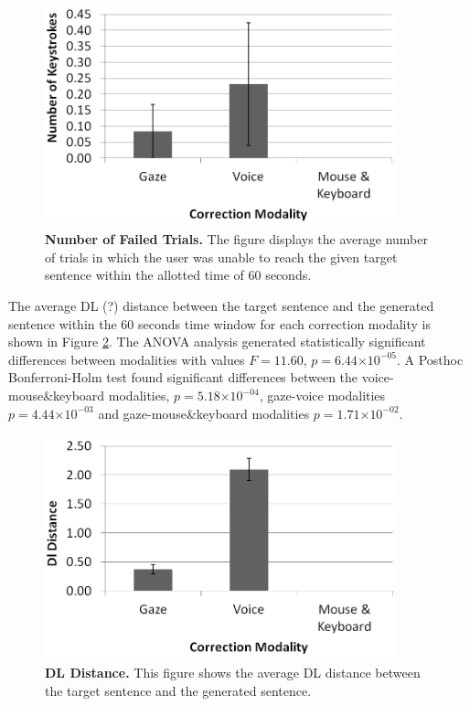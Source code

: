 \documentclass[]{article}
\providecommand{\e}[1]{\ensuremath{\times 10^{#1}}}
\begin{document}
\begin{figure}[ht]
\begin{center}
\vspace{-3mm}
\includegraphics[width=0.9\textwidth,height=65mm]{figures/fail.png}
\end{center}
\caption{\textbf{Number of Failed Trials.} The figure displays the average number of trials in which the user
was unable to reach the given target sentence within the allotted time of 60 seconds.}
\label{failFig}
\end{figure}

The average DL (?) distance between the target sentence and the generated sentence within the 60 seconds time window for
each correction modality is shown in Figure \ref{dldistance}. The ANOVA analysis generated statistically
significant differences between modalities with values $F=11.60$, $p=6.44\e{-05}$. A Posthoc Bonferroni-Holm test found
significant differences between the voice-mouse\&keyboard modalities, $p=5.18\e{-04}$, gaze-voice modalities
$p=4.44\e{-03}$ and gaze-mouse\&keyboard modalities $p=1.71\e{-02}$. 

\begin{figure}[ht]
\begin{center}
\vspace{-3mm}
\includegraphics[width=0.9\textwidth,height=65mm]{figures/dldistance.png}
\end{center}
\caption{\textbf{DL Distance.} This figure shows the average DL distance between the target sentence and the generated
sentence.}
\label{dldistance}
\end{figure}
\end{document}
